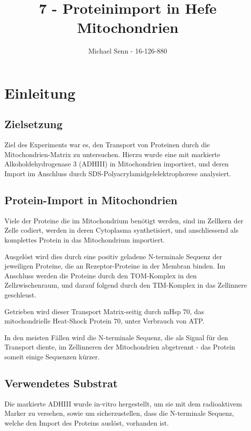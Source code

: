 \documentclass[a4paper,german]{scrreprt}
\title{7 - Proteinimport in Hefe Mitochondrien}
\author{Michael Senn \maillink{michael.senn@students.unibe.ch} - 16-126-880}
\date{\printdate}
\begin{document}
\maketitle

\chapter{Einleitung}

\section{Zielsetzung}

Ziel des Experiments war es, den Transport von Proteinen durch die
Mitochondrien-Matrix zu untersuchen. Hierzu wurde eine mit
 markierte Alkoholdehydrogenase 3 (ADHIII) in
Mitochondrien importiert, und deren Import im Anschluss durch
SDS-Polyacrylamidgelelektrophorese analysiert.

\section{Protein-Import in Mitochondrien}

Viele der Proteine die im Mitochondrium benötigt werden, sind im Zellkern der
Zelle codiert, werden in deren Cytoplasma synthetisiert, und anschliessend als
komplettes Protein in das Mitochondrium importiert.

Ausgelöst wird dies durch eine positiv geladene N-terminale Sequenz der
jeweiligen Proteine, die an Rezeptor-Proteine in der Membran binden. Im
Anschluss werden die Proteine durch den TOM-Komplex in den Zellzwischenraum,
und darauf folgend durch den TIM-Komplex in das Zellinnere
geschleust\cite{protein_transport}.

Getrieben wird dieser Transport Matrix-seitig durch mHsp 70, das
mitochondrielle Heat-Shock Protein 70, unter Verbrauch von ATP.

In den meisten Fällen wird die N-terminale Sequenz, die als Signal für den
Transport diente, im Zellinneren der Mitochondrien abgetrennt - das Protein
someit einige Sequenzen kürzer.

\section{Verwendetes Substrat}

Die  markierte ADHIII wurde in-vitro hergestellt,
um sie mit dem radioaktivem Marker zu versehen, sowie um sicherzustellen, dass
die N-terminale Sequenz, welche den Import des Proteins auslöst, vorhanden ist.
\end{document}
